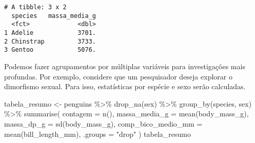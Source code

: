 \documentclass[
  12pt,
  letterpaper,
  DIV=11,
  numbers=noendperiod]{scrreprt}
\newenvironment{Shaded}{\begin{snugshade}}{\end{snugshade}}
\newcommand{\AttributeTok}[1]{\textcolor[rgb]{0.40,0.45,0.13}{#1}}
\newcommand{\FunctionTok}[1]{\textcolor[rgb]{0.28,0.35,0.67}{#1}}
\newcommand{\NormalTok}[1]{\textcolor[rgb]{0.00,0.23,0.31}{#1}}
\newcommand{\OtherTok}[1]{\textcolor[rgb]{0.00,0.23,0.31}{#1}}
\newcommand{\SpecialCharTok}[1]{\textcolor[rgb]{0.37,0.37,0.37}{#1}}
\newcommand{\StringTok}[1]{\textcolor[rgb]{0.13,0.47,0.30}{#1}}
\begin{document}
\begin{verbatim}
# A tibble: 3 x 2
  species   massa_media_g
  <fct>             <dbl>
1 Adelie            3701.
2 Chinstrap         3733.
3 Gentoo            5076.
\end{verbatim}

\noindent Podemos fazer agrupamentos por múltiplas variáveis para
investigações mais profundas. Por exemplo, considere que um pesquisador
deseja explorar o dimorfismo sexual. Para isso, estatísticas por espécie
e sexo serão calculadas.

\begin{Shaded}
\begin{Highlighting}[]
\NormalTok{tabela\_resumo }\OtherTok{\textless{}{-}}\NormalTok{ penguins }\SpecialCharTok{\%\textgreater{}\%} 
  \FunctionTok{drop\_na}\NormalTok{(sex) }\SpecialCharTok{\%\textgreater{}\%} 
  \FunctionTok{group\_by}\NormalTok{(species, sex) }\SpecialCharTok{\%\textgreater{}\%} 
  \FunctionTok{summarise}\NormalTok{(}
    \AttributeTok{contagem =} \FunctionTok{n}\NormalTok{(),}
    \AttributeTok{massa\_media\_g =} \FunctionTok{mean}\NormalTok{(body\_mass\_g),}
    \AttributeTok{massa\_dp\_g =} \FunctionTok{sd}\NormalTok{(body\_mass\_g),}
    \AttributeTok{comp\_bico\_medio\_mm =} \FunctionTok{mean}\NormalTok{(bill\_length\_mm),}
    \AttributeTok{.groups =} \StringTok{"drop"}
\NormalTok{  )}
\NormalTok{tabela\_resumo}
\end{Highlighting}
\end{Shaded}

\begin{table}[H]

\caption{\label{tbl-tabela-resumo1}Estatísticas descritivas de
características biométricas de pinguins, agrupadas por espécie e sexo.}


\end{table}%
\end{document}
